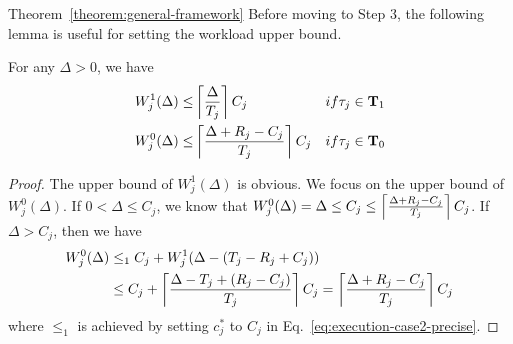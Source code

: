 \begin{appProof}{Theorem~\ref{theorem:general-framework}}
Before moving to Step 3, the following lemma is useful for setting the workload upper bound.
\begin{Lemma}
  \label{lemma:W_0-and-W_1-upper}
For any $\Delta > 0$, we have
\begin{align}
  W_j^1(\Delta)  \leq &\ceiling{\frac{\Delta}{T_j}}C_j & \mbox{ if } \tau_j \in {\bf T}_1   \label{eq:W_1-upper}\\
  W_j^0(\Delta)  \leq &\ceiling{\frac{\Delta+R_j-C_j}{T_j}}C_j & \mbox{ if } \tau_j \in {\bf T}_0   \label{eq:W_0-upper}
\end{align}
\end{Lemma}
\begin{proof}
  The upper bound of $W_j^1(\Delta)$ is obvious. We focus on the upper bound of $W_j^0(\Delta)$. If $0 < \Delta \leq C_j$, we know that $W_j^0(\Delta) = \Delta \leq C_j \leq \left\lceil{\frac{\Delta+R_j-C_j}{T_j}}\right\rceil C_j$. If $\Delta > C_j$, then we have
{\small \begin{align*}
W_j^0(\Delta) &\leq_1 C_j + W_j^1(\Delta - (T_j-R_j+C_j))\nonumber\\
& \leq C_j+\left\lceil{\frac{\Delta-T_j +(R_j-C_j)}{T_j}}\right\rceil C_j  = \left\lceil{\frac{\Delta+R_j-C_j}{T_j}}\right\rceil C_j 
\end{align*}} where $\leq_1$ is achieved by setting
$c_j^*$ to $C_j$ in Eq.~\eqref{eq:execution-case2-precise}.
\end{proof}





		

\end{appProof}
